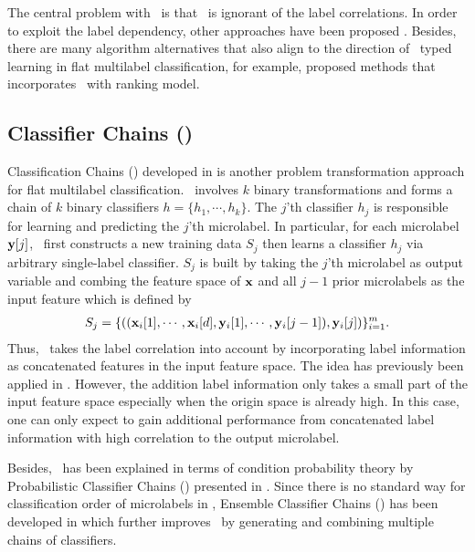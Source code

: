 {The central problem with \mlknn\ is that \mlknn\ is ignorant of the label correlations.
In order to exploit the label dependency, other approaches have been proposed \citep{Cheng09combining,Younes11a}.
Besides, there are many algorithm alternatives that also align to the direction of \knn\ typed learning in flat multilabel classification, for example, \citet{Brinker07case,Chiang12a} proposed methods that incorporates \knn\ with ranking model.


%
%
\subsection{Classifier Chains (\cc)}

Classification Chains (\cc) developed in \citep{Read09classifier,Read11classifier} is another problem transformation approach for flat multilabel classification.
\cc\ involves $k$ binary transformations and forms a chain of $k$ binary classifiers $h=\{h_1,\cdots,h_k\}$.
The $j$'th classifier $h_j$ is responsible for learning and predicting the $j$'th microlabel.
In particular, for each microlabel $\mathbf {y}[j]$, \cc\ first constructs a new training data $S_j$ then learns a classifier $h_j$ via arbitrary single-label classifier.
$S_j$ is built by taking the $j$'th microlabel as output variable and combing the feature space of $\mathbf {x}$ and all $j-1$ prior microlabels as the input feature which is defined by
\begin{align*}
	S_j = \{((\mathbf {x}_i[1],\cdots,\mathbf {x}_i[d],\mathbf {y}_i[1],\cdots,\mathbf {y}_i[j-1]),\mathbf {y}_i[j])\}_{i=1}^{m}.
\end{align*} 
Thus, \cc\ takes the label correlation into account by incorporating label information as concatenated features in the input feature space.
The idea has previously been applied in \citep{Godbole04discriminative}.
However, the addition label information only takes a small part of the input feature space especially when the origin space is already high.
In this case, one can only expect to gain additional performance from concatenated label information with high correlation to the output microlabel.

Besides, \cc\ has been explained in terms of condition probability theory by Probabilistic Classifier Chains (\pcc) presented in \citep{Read09classifier,Dembczynski10bayes}.
Since there is no standard way for classification order of microlabels in \cc, Ensemble Classifier Chains (\ecc) has been developed in \citep{Read11classifier} which further improves \cc\ by generating and combining multiple chains of classifiers. 


}
